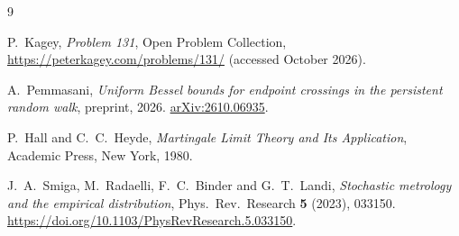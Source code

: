\documentclass[11pt]{article}
\theoremstyle{definition}
\theoremstyle{remark}
\begin{document}
\begin{thebibliography}{9}\small

P.~Kagey, \emph{Problem 131}, Open Problem Collection,
\url{https://peterkagey.com/problems/131/} (accessed October 2026).

A.~Pemmasani, \emph{Uniform Bessel bounds for endpoint crossings in the
persistent random walk}, preprint, 2026.
\href{https://arxiv.org/abs/2610.06935}{arXiv:2610.06935}.

P.~Hall and C.~C.~Heyde, \emph{Martingale Limit Theory and Its
Application}, Academic Press, New York, 1980.

J.~A.~Smiga, M.~Radaelli, F.~C.~Binder and G.~T.~Landi, \emph{Stochastic
metrology and the empirical distribution}, Phys.~Rev.~Research \textbf{5}
(2023), 033150. \url{https://doi.org/10.1103/PhysRevResearch.5.033150}.

\end{thebibliography}
\end{document}
